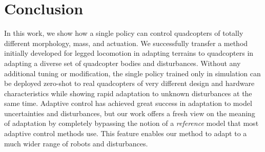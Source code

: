 \section{Conclusion}
In this work, we show how a single policy can control quadcopters of totally different morphology, mass, and actuation. 
%
We successfully transfer a method initially developed for legged locomotion in adapting terrains to quadcopters in adapting a diverse set of quadcopter bodies and disturbances.
%
Without any additional tuning or modification, the single policy trained only in simulation can be deployed zero-shot to real quadcopters of very different design and hardware characteristics while showing rapid adaptation to unknown disturbances at the same time.
%
Adaptive control has achieved great success in adaptation to model uncertainties and disturbances, but our work offers a fresh view on the meaning of adaptation by completely bypassing the notion of a \emph{reference} model that most adaptive control methods use. 
%
%
This feature enables our method to adapt to a much wider range of robots and disturbances.
%
%
%
%
